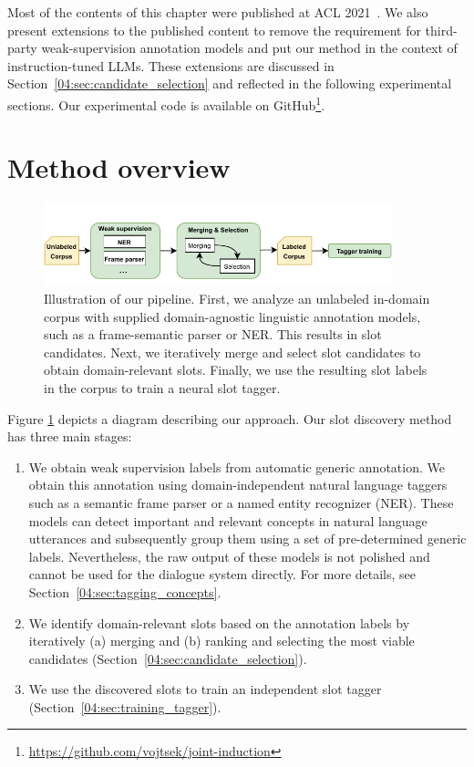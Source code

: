 Most of the contents of this chapter were published at ACL 2021~\cite{hudecek-etal-2021-discovering}.
We also present extensions to the published content to remove the requirement for third-party weak-supervision annotation models and put our method in the context of instruction-tuned LLMs.
These extensions are discussed in Section~\ref{04:sec:candidate_selection} and reflected in the following experimental sections.
Our experimental code is available on GitHub\footnote{\url{https://github.com/vojtsek/joint-induction}}.

\section{Method overview}
\label{04:sec:overview}
\begin{figure}[h]
    \centering
    \includegraphics[width=0.9\textwidth]{images/weakly-supervised.pdf}
    \caption{Illustration of our pipeline. First, we analyze an unlabeled in-domain corpus with supplied domain-agnostic linguistic annotation models, such as a frame-semantic parser or NER. This results in slot candidates. Next, we iteratively merge and select slot candidates to obtain domain-relevant slots. Finally, we use the resulting slot labels in the corpus to train a neural slot tagger.}
    \label{fig:discover_overall}
\end{figure}
Figure \ref{fig:discover_overall} depicts a diagram describing our approach.
Our slot discovery method has three main stages:
\begin{enumerate}
    \item We obtain weak supervision labels from automatic generic annotation.
    We obtain this annotation using domain-independent natural language taggers such as a semantic frame parser or a named entity recognizer (NER).
    These models can detect important and relevant concepts in natural language utterances and subsequently group them using a set of pre-determined generic labels.
    Nevertheless, the raw output of these models is not polished and cannot be used for the dialogue system directly.
    For more details, see Section~\ref{04:sec:tagging_concepts}.
    \item We identify domain-relevant slots based on the annotation labels by iteratively (a) merging and (b) ranking and selecting the most viable candidates (Section~\ref{04:sec:candidate_selection}).
    
    \item We use the discovered slots to train an independent slot tagger (Section~\ref{04:sec:training_tagger}).
\end{enumerate}

